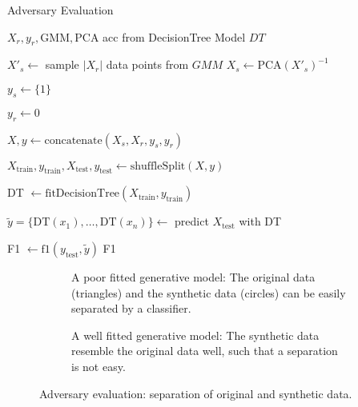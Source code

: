 \documentclass[../../main.tex]{subfiles}
\begin{document}
 \begin{algorithm}
    \caption{Adversary Evaluation}
    \label{alg:ml_efficacy}
 
    \begin{algorithmic}[1]
        \REQUIRE $X_r, y_r, \text{GMM}, \text{PCA}$
        \ENSURE acc from DecisionTree Model $DT$

        \STATE $X'_s \leftarrow$ sample $|X_r|$ data points from $GMM$
        \STATE $X_s \leftarrow \text{PCA}(X'_s)^{-1}$  

        \STATE $y_s \leftarrow \{ 1 \}$ 

        \STATE $y_r \leftarrow 0$ 
        
        \STATE $X, y \leftarrow \text{concatenate}(X_s, X_r, y_s, y_r)$
        
        \STATE $X_{\text{train}}, y_{\text{train}}, X_{\text{test}}, y_{\text{test}} \leftarrow \text{shuffleSplit}(X,y)$

        \STATE DT $\leftarrow \text{fitDecisionTree}(X_{\text{train}}, y_{\text{train}})$

        \STATE $\tilde{y} = \{\text{DT}(x_1), \dots, \text{DT}(x_n)\} \leftarrow$ predict $X_{\text{test}}$ with DT

        \STATE F1 $\leftarrow \text{f1}(y_{\text{test}}, \tilde{y})$
        \RETURN F1
    \end{algorithmic}
 \end{algorithm}


 \begin{figure}%
    \centering%
    \begin{subfigure}[b]{0.49\textwidth}%
        \centering\captionsetup{width=.8\linewidth}%
        \caption{A poor fitted generative model: The original data (triangles) and the synthetic data (circles) can be easily separated by a classifier.}%
        \label{subfig:adversary_evaluation_bad}%
    \end{subfigure}%
    \hfill%
    \begin{subfigure}[b]{0.49\textwidth}%
        \centering\captionsetup{width=.8\linewidth}%
        \caption{A well fitted generative model: The synthetic data resemble the original data well, such that a separation is not easy.}%
        \label{subfig:adversary_evaluation_good}%
    \end{subfigure}%
    \caption{Adversary evaluation: separation of original and synthetic data.}%
    \label{fig:adversary_evaluation}%
\end{figure}%
\end{document}
